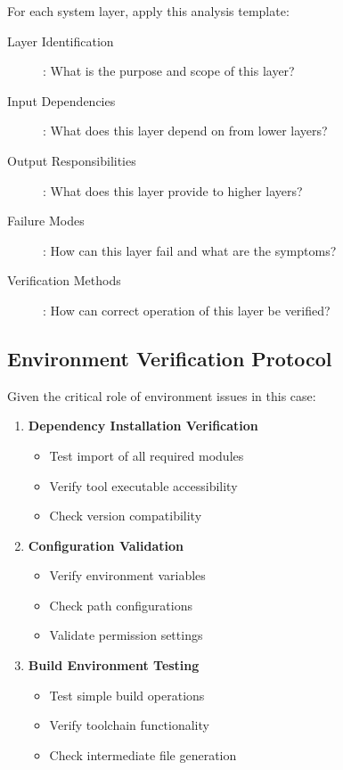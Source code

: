 \documentclass[11pt,a4paper]{article}
\begin{document}
For each system layer, apply this analysis template:

\begin{description}
\item[Layer Identification]: What is the purpose and scope of this layer?
\item[Input Dependencies]: What does this layer depend on from lower layers?
\item[Output Responsibilities]: What does this layer provide to higher layers?
\item[Failure Modes]: How can this layer fail and what are the symptoms?
\item[Verification Methods]: How can correct operation of this layer be verified?
\end{description}

\subsection{Environment Verification Protocol}

Given the critical role of environment issues in this case:

\begin{enumerate}
\item \textbf{Dependency Installation Verification}
   \begin{itemize}
   \item Test import of all required modules
   \item Verify tool executable accessibility
   \item Check version compatibility
   \end{itemize}

\item \textbf{Configuration Validation}
   \begin{itemize}
   \item Verify environment variables
   \item Check path configurations
   \item Validate permission settings
   \end{itemize}

\item \textbf{Build Environment Testing}
   \begin{itemize}
   \item Test simple build operations
   \item Verify toolchain functionality
   \item Check intermediate file generation
   \end{itemize}
\end{enumerate}
\end{document}
